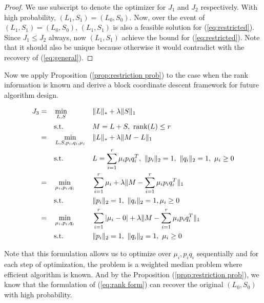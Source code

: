 \begin{proof}
We use subscript to denote the optimizer for $J_{1}$ and $J_{2}$ respectively.
With high probability, $(L_{1},S_{1})=(L_{0},S_{0})$. Now, over the event of $(L_{1},S_{1})=(L_{0},S_{0})$, $(L_{1},S_{1})$ is also a feasible solution for (\ref{eq:restricted}). Since $J_{1}\le J_{2}$ always, now $(L_{1},S_{1})$ achieve the bound for (\ref{eq:restricted}).
Note that it should also be unique because otherwise it would contradict with the recovery of (\ref{eq:general}).
\end{proof}

Now we apply Proposition (\ref{prop:restriction prob}) to the case when the rank information is known and derive a block coordinate descent framework for future algorithm design.

\begin{alignat}{3}
J_{3}
&= &&\min_{L, S}  && \|L\|_{*} + \lambda \|S\|_{1} \notag \\
&&&\text{s.t.} && M=L+S, \ \text{rank}(L)\le r \notag \\
&= &&\min_{L, S, p_i, q_i, \mu_i} && \|L\|_{*} + \lambda\| M - L \|_{1} \notag \\
&&& \text{s.t.} && L = \sum_{i=1}^{r} \mu_{i}p_{i}q_{i}^{T}, \  \|p_{i}\|_{2}=1, \ \|q_{i}\|_{2}=1, \ \mu_{i}\ge0 \notag \\
&= && \min_{\mu_{i}, p_{i}, q_{i}} && \sum_{i=1}^{r} \mu_{i} + \lambda \|M - \sum_{i=1}^{r} \mu_{i}p_{i}q_{i}^{T}\|_{1} \notag \\
&&& \text{s.t.} && \|p_{i}\|_{2} = 1, \ \|q_{i}\|_{2} = 1, \mu_{i} \ge 0 \notag \\
& = && \min_{\mu_{i}, p_{i}, q_{i}} && \sum_{i=1}^{r} |\mu_{i}-0| + \lambda \|M - \sum_{i=1}^{r} \mu_{i} p_{i} q_{i}^{T}\|_{1} \label{eq:rank form} \\
&&& \text{s.t.} && \|p_{i}\|_{2} = 1, \ \|q_{i}\|_{2} = 1, \ \mu_{i} \ge 0 \notag
\end{alignat}

Note that this formulation allows us to optimize over $\mu_{i},p_{i}q_{i}$ sequentially and for each step of optimization, the problem is a weighted median problem where efficient algorithm is known. And by the Proposition (\ref{prop:restriction prob}), we know that the formulation of (\ref{eq:rank form}) can recover the original $(L_{0},S_{0})$ with high probability.


